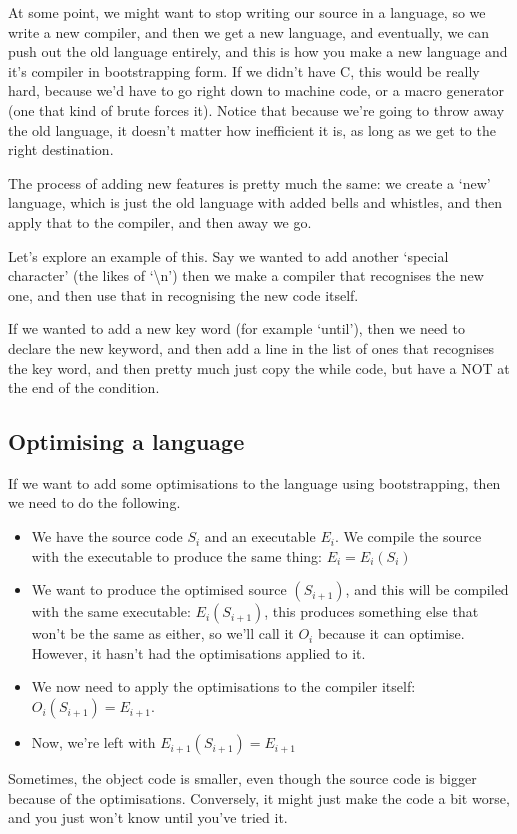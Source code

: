 \documentclass[11pt,a4paper,titlepage,dvipsnames,cmyk]{scrartcl}
\begin{document}
At some point, we might want to stop writing our source in a language, so
we write a new compiler, and then we get a new language, and eventually,
we can push out the old language entirely, and this is how you make a new
language and it's compiler in bootstrapping form. If we didn't have C,
this would be really hard, because we'd have to go right down to machine
code, or a macro generator (one that kind of brute forces it). Notice that
because we're going to throw away the old language, it doesn't matter how
inefficient it is, as long as we get to the right destination.

The process of adding new features is pretty much the same: we create a
`new' language, which is just the old language with added bells and
whistles, and then apply that to the compiler, and then away we go.

Let's explore an example of this. Say we wanted to add another `special
character' (the likes of `\textbackslash n') then we make a compiler that
recognises the new one, and then use that in recognising the new code
itself.

If we wanted to add a new key word (for example `until'), then we need to
declare the new keyword, and then add a line in the list of ones that
recognises the key word, and then pretty much just copy the while code,
but have a NOT at the end of the condition.

\subsection{Optimising a language}%
\label{sub:optimising-bootstrapping}
If we want to add some optimisations to the language using bootstrapping,
then we need to do the following.

\begin{itemize}
    \item We have the source code $S_i$ and an executable $E_i$. We
        compile the source with the executable to produce the same thing:
        $E_i = E_i(S_i)$
    \item We want to produce the optimised source $(S_{i+1})$, and this
        will be compiled with the same executable: $E_i(S_{i+1})$, this
        produces something else that won't be the same as either, so we'll
        call it $O_i$ because it can optimise. However, it hasn't had the
        optimisations applied to it.
    \item We now need to apply the optimisations to the compiler itself:
        $O_i(S_{i+1}) = E_{i+1}$.
    \item Now, we're left with $E_{i+1}(S_{i+1}) = E_{i+1}$
\end{itemize}

Sometimes, the object code is smaller, even though the source code is
bigger because of the optimisations. Conversely, it might just make the
code a bit worse, and you just won't know until you've tried it.

\end{document}
